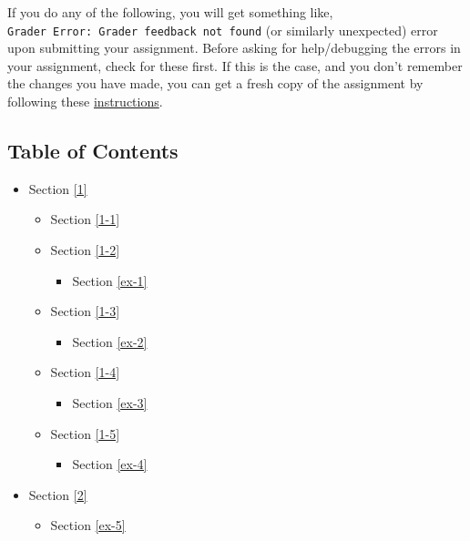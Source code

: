 \documentclass[11pt]{article}
\providecommand{\tightlist}{%
      \setlength{\itemsep}{0pt}\setlength{\parskip}{0pt}}
\begin{document}
If you do any of the following, you will get something like,
\texttt{Grader\ Error:\ Grader\ feedback\ not\ found} (or similarly
unexpected) error upon submitting your assignment. Before asking for
help/debugging the errors in your assignment, check for these first. If
this is the case, and you don't remember the changes you have made, you
can get a fresh copy of the assignment by following these
\href{https://www.coursera.org/learn/classification-vector-spaces-in-nlp/supplement/YLuAg/h-ow-to-refresh-your-workspace}{instructions}.

    \hypertarget{table-of-contents}{%
\subsection{Table of Contents}\label{table-of-contents}}

\begin{itemize}
\tightlist
\item
  Section \ref{1}

  \begin{itemize}
  \tightlist
  \item
    Section \ref{1-1}
  \item
    Section \ref{1-2}

    \begin{itemize}
    \tightlist
    \item
      Section \ref{ex-1}
    \end{itemize}
  \item
    Section \ref{1-3}

    \begin{itemize}
    \tightlist
    \item
      Section \ref{ex-2}
    \end{itemize}
  \item
    Section \ref{1-4}

    \begin{itemize}
    \tightlist
    \item
      Section \ref{ex-3}
    \end{itemize}
  \item
    Section \ref{1-5}

    \begin{itemize}
    \tightlist
    \item
      Section \ref{ex-4}
    \end{itemize}
  \end{itemize}
\item
  Section \ref{2}

  \begin{itemize}
  \tightlist
  \item
    Section \ref{ex-5}
  \end{itemize}
\end{itemize}
\end{document}
